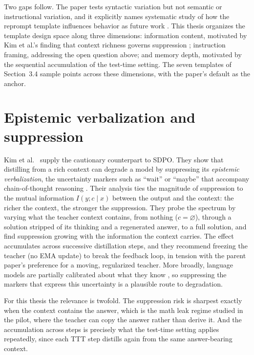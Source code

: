 \documentclass[12pt,a4paper]{report}
\begin{document}
Two gaps follow. The paper tests syntactic variation but not semantic or instructional variation, and it explicitly names systematic study of how the reprompt template influences behavior as future work \cite{r1}. This thesis organizes the template design space along three dimensions: information content, motivated by Kim et al.'s finding that context richness governs suppression \cite{r2}; instruction framing, addressing the open question above; and memory depth, motivated by the sequential accumulation of the test-time setting. The seven templates of Section~3.4 sample points across these dimensions, with the paper's default as the anchor.

\section{Epistemic verbalization and suppression}\label{epistemic-verbalization-and-suppression}

Kim et al.~\cite{r2} supply the cautionary counterpart to SDPO. They show that distilling from a rich context can degrade a model by suppressing its \emph{epistemic verbalization}, the uncertainty markers such as ``wait'' or ``maybe'' that accompany chain-of-thought reasoning \cite{r17}. Their analysis ties the magnitude of suppression to the mutual information \(I(y; c \mid x)\) between the output and the context: the richer the context, the stronger the suppression. They probe the spectrum by varying what the teacher context contains, from nothing (\(c = \varnothing\)), through a solution stripped of its thinking and a regenerated answer, to a full solution, and find suppression growing with the information the context carries. The effect accumulates across successive distillation steps, and they recommend freezing the teacher (no EMA update) to break the feedback loop, in tension with the parent paper's preference for a moving, regularized teacher. More broadly, language models are partially calibrated about what they know \cite{r23}, so suppressing the markers that express this uncertainty is a plausible route to degradation.

For this thesis the relevance is twofold. The suppression risk is sharpest exactly when the context contains the answer, which is the math leak regime studied in the pilot, where the teacher can copy the answer rather than derive it. And the accumulation across steps is precisely what the test-time setting applies repeatedly, since each TTT step distills again from the same answer-bearing context.
\end{document}
